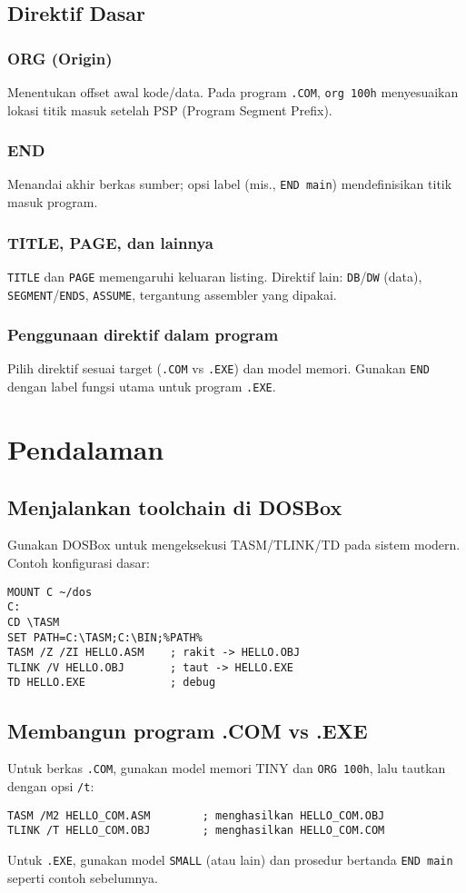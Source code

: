 \subsection{Direktif Dasar}
\subsubsection{ORG (Origin)}
Menentukan offset awal kode/data. Pada program \texttt{.COM}, \texttt{org 100h} menyesuaikan lokasi titik masuk setelah PSP (Program Segment Prefix).

\subsubsection{END}
Menandai akhir berkas sumber; opsi label (mis., \texttt{END main}) mendefinisikan titik masuk program.

\subsubsection{TITLE, PAGE, dan lainnya}
\texttt{TITLE} dan \texttt{PAGE} memengaruhi keluaran listing. Direktif lain: \texttt{DB}/\texttt{DW} (data), \texttt{SEGMENT}/\texttt{ENDS}, \texttt{ASSUME}, tergantung assembler yang dipakai.

\subsubsection{Penggunaan direktif dalam program}
Pilih direktif sesuai target (\texttt{.COM} vs \texttt{.EXE}) dan model memori. Gunakan \texttt{END} dengan label fungsi utama untuk program \texttt{.EXE}.

\section{Pendalaman}\label{sec:tasm-pendalaman}
\subsection{Menjalankan toolchain di DOSBox}
Gunakan DOSBox untuk mengeksekusi TASM/TLINK/TD pada sistem modern. Contoh konfigurasi dasar: \cite{dosbox_manual}
\begin{verbatim}
MOUNT C ~/dos
C:
CD \TASM
SET PATH=C:\TASM;C:\BIN;%PATH%
TASM /Z /ZI HELLO.ASM    ; rakit -> HELLO.OBJ
TLINK /V HELLO.OBJ       ; taut -> HELLO.EXE
TD HELLO.EXE             ; debug
\end{verbatim}

\subsection{Membangun program .COM vs .EXE}
Untuk berkas \texttt{.COM}, gunakan model memori TINY dan \texttt{ORG 100h}, lalu tautkan dengan opsi \texttt{/t}:
\begin{verbatim}
TASM /M2 HELLO_COM.ASM        ; menghasilkan HELLO_COM.OBJ
TLINK /T HELLO_COM.OBJ        ; menghasilkan HELLO_COM.COM
\end{verbatim}
Untuk \texttt{.EXE}, gunakan model \texttt{SMALL} (atau lain) dan prosedur bertanda \texttt{END main} seperti contoh sebelumnya. \cite{borland1990tasm}

